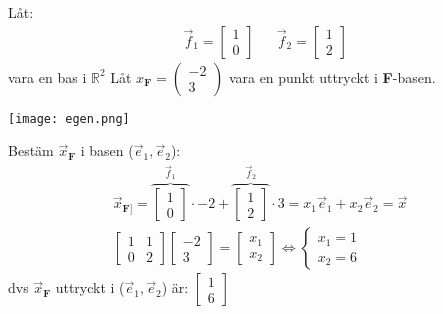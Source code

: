 \begin{Ex}
	Låt:
	\begin{align*}
	&\vec{f}_1 = \begin{bmatrix} 1\\0 \end{bmatrix}
	&&\vec{f}_2 = \begin{bmatrix} 1\\2 \end{bmatrix}
	\end{align*}
	vara en bas i $\mathbb{R}^2$
	Låt $x_\mathbf{F} = \begin{pmatrix} -2\\3 \end{pmatrix}$ vara en punkt uttryckt i \textbf{F}-basen.
	\begin{center}
		\texttt{[image: egen.png]}
	\end{center}
	Bestäm $\vec{x}_\mathbf{F}$ i basen ($\vec{e}_1, \vec{e}_2$):
	\begin{gather*}
		\vec{x}_\mathbf{F]} = 
		\overbrace{\begin{bmatrix} 1\\0 \end{bmatrix}}^{\vec{f}_1} \cdot -2 + 
		\overbrace{\begin{bmatrix} 1\\2 \end{bmatrix}}^{\vec{f}_2} 
		\cdot 3 = x_1 \vec{e}_1 + x_2 \vec{e}_2 = \vec{x}\\
		\begin{bmatrix} 1&1\\0&2 \end{bmatrix} \begin{bmatrix} -2\\3 \end{bmatrix} = \begin{bmatrix} x_1\\x_2 \end{bmatrix} 
		\Leftrightarrow 
		\begin{cases}
			x_1 = 1\\
			x_2 = 6
		\end{cases}
	\end{gather*}
	dvs $\vec{x}_\mathbf{F}$ uttryckt i ($\vec{e}_1, \vec{e}_2$) är: $\begin{bmatrix} 1\\6 \end{bmatrix}$\\

\end{Ex}
